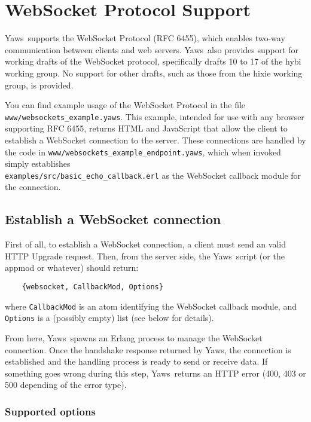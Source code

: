 \documentclass[11pt,oneside,english]{book}
\newcommand{\Yaws}            %
        {{\sc Yaws}}
\begin{document}
\chapter{WebSocket Protocol Support}
\label{websockets}

\Yaws\ supports the WebSocket Protocol (RFC 6455), which enables two-way
communication between clients and web servers. \Yaws\ also provides support for
working drafts of the WebSocket protocol, specifically drafts 10 to 17 of the
hybi working group. No support for other drafts, such as those from the hixie
working group, is provided.

You can find example usage of the WebSocket Protocol in the file
\verb+www/websockets_example.yaws+. This example, intended for use with any
browser supporting RFC 6455, returns HTML and JavaScript that allow the client
to establish a WebSocket connection to the server. These connections are handled
by the code in \verb+www/websockets_example_endpoint.yaws+, which when invoked
simply establishes \\ \verb+examples/src/basic_echo_callback.erl+ as the
WebSocket callback module for the connection.


\section{Establish a WebSocket connection}

First of all, to establish a WebSocket connection, a client must send an valid
HTTP Upgrade request. Then, from the server side, the \Yaws{}ript (or the appmod
or whatever) should return:

\begin{verbatim}
    {websocket, CallbackMod, Options}
\end{verbatim}

where \verb+CallbackMod+ is an atom identifying the WebSocket callback module,
and \verb+Options+ is a (possibly empty) list (see below for details).


From here, \Yaws\ spawns an Erlang process to manage the WebSocket
connection. Once the handshake response returned by \Yaws, the connection is
established and the handling process is ready to send or receive data. If
something goes wrong during this step, \Yaws\ returns an HTTP error (400, 403 or
500 depending of the error type).

\subsection{Supported options}
\end{document}
